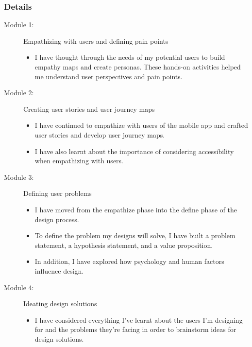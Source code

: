 \subsubsection{Details}
\begin{flushleft}
	\begin{description}
		\item[Module 1:] Empathizing with users and defining pain points
		      \begin{itemize}
			      \item I have thought through the needs of my potential users to build empathy maps and create personas. These hands-on activities helped me understand user perspectives and pain points.
		      \end{itemize}
		\item[Module 2:] Creating user stories and user journey maps
		      \begin{itemize}
			      \item I have continued to empathize with users of the mobile app and crafted user stories and develop user journey maps.
			      \item I have also learnt about the importance of considering accessibility when empathizing with users.
		      \end{itemize}
		\item[Module 3:] Defining user problems
		      \begin{itemize}
			      \item I have moved from the empathize phase into the define phase of the design process.
			      \item To define the problem my designs will solve, I have built a problem statement, a hypothesis statement, and a value proposition.
			      \item In addition, I have explored how psychology and human factors influence design.
		      \end{itemize}
		\item[Module 4:] Ideating design solutions
		      \begin{itemize}
			      \item I have considered everything I've learnt about the users I'm designing for and the problems they're facing in order to brainstorm ideas for design solutions.
		      \end{itemize}
	\end{description}
\end{flushleft}